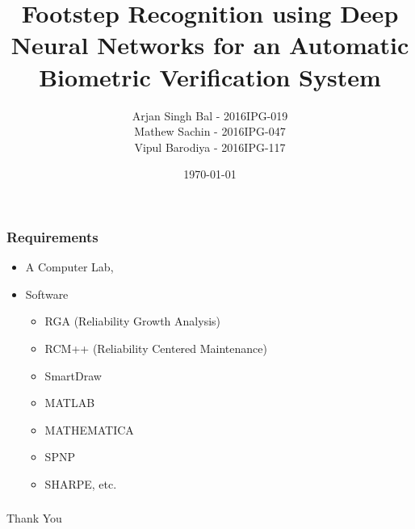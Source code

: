 \documentclass{beamer}
\title[IIT Roorkee]{Footstep Recognition using Deep Neural Networks for an Automatic Biometric Verification System}
\author{Arjan Singh Bal - 2016IPG-019 \\
Mathew Sachin - 2016IPG-047 \\
Vipul Barodiya - 2016IPG-117
}
\institute[]{
ABV-IIITM Gwalior\\
Gwalior-474 010, MP, India
}
\date{\today}
\begin{document}
\frame{\titlepage}


\begin{frame}\frametitle{Requirements}
\begin{itemize}
\item A Computer Lab,
\item Software
\begin{itemize}
  \item RGA (Reliability Growth Analysis)
  \item RCM++ (Reliability Centered Maintenance)
  \item  SmartDraw
  \item  MATLAB
  \item MATHEMATICA
  \item SPNP
  \item SHARPE, etc.
\end{itemize}
\end{itemize}
\end{frame}

\begin{frame}\frametitle{}
\Huge
\begin{center}Thank You \end{center}
\end{frame}
\end{document}
